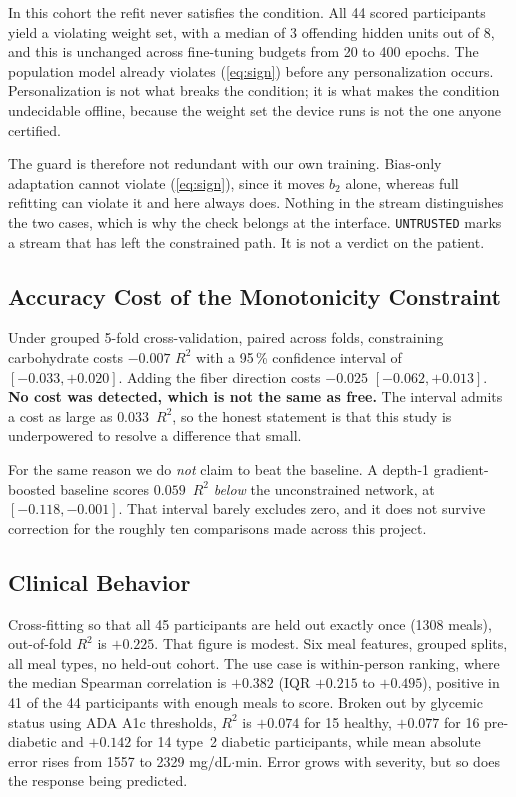 \documentclass[conference]{IEEEtran}
\begin{document}
In this cohort the refit never satisfies the condition. All 44 scored
participants yield a violating weight set, with a median of 3 offending hidden
units out of 8, and this is unchanged across fine-tuning budgets from 20 to 400
epochs. The population model already violates (\ref{eq:sign}) before any
personalization occurs. Personalization is not what breaks the condition; it is
what makes the condition undecidable offline, because the weight set the device
runs is not the one anyone certified.

The guard is therefore not redundant with our own training. Bias-only
adaptation cannot violate (\ref{eq:sign}), since it moves $b_2$ alone, whereas
full refitting can violate it and here always does. Nothing in the stream
distinguishes the two cases, which is why the check belongs at the interface.
\texttt{UNTRUSTED} marks a stream that has left the constrained path. It is not
a verdict on the patient.

\subsection{Accuracy Cost of the Monotonicity Constraint}

Under grouped 5-fold cross-validation, paired across folds, constraining
carbohydrate costs $-0.007$ $R^2$ with a 95\,\% confidence interval of
$[-0.033, +0.020]$. Adding the fiber direction costs $-0.025$
$[-0.062, +0.013]$. \textbf{No cost was detected, which is not the same as
free.} The interval admits a cost as large as $0.033$~$R^2$, so the honest
statement is that this study is underpowered to resolve a difference that
small.

For the same reason we do \emph{not} claim to beat the baseline. A depth-1
gradient-boosted baseline scores $0.059$~$R^2$ \emph{below} the unconstrained
network, at $[-0.118, -0.001]$. That interval barely excludes zero, and it does
not survive correction for the roughly ten comparisons made across this
project.

\subsection{Clinical Behavior}

Cross-fitting so that all 45 participants are held out exactly once (1308
meals), out-of-fold $R^2$ is $+0.225$. That figure is modest. Six meal
features, grouped splits, all meal types, no held-out cohort. The use case is
within-person ranking, where the median Spearman correlation is $+0.382$
(IQR $+0.215$ to $+0.495$), positive in 41 of the 44 participants with enough
meals to score. Broken out by glycemic status using ADA A1c thresholds, $R^2$
is $+0.074$ for 15 healthy, $+0.077$ for 16 pre-diabetic and $+0.142$ for 14
type~2 diabetic participants, while mean absolute error rises from 1557 to 2329
mg/dL$\cdot$min. Error grows with severity, but so does the response being
predicted.
\end{document}
